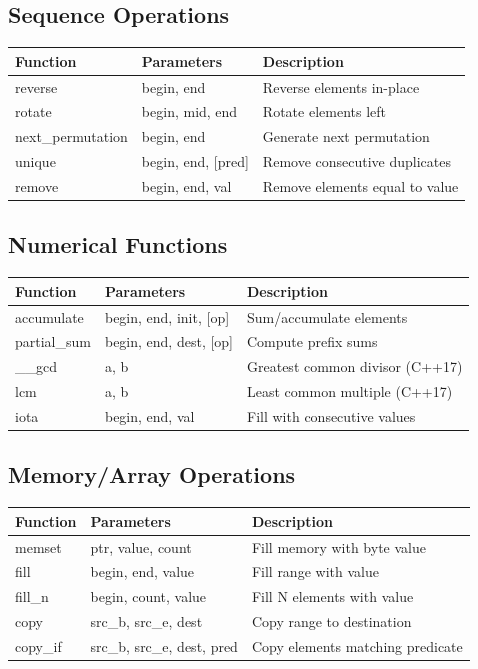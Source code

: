 \documentclass[10pt]{article}
\begin{document}
\begin{multicols*}{2}
\subsection*{Sequence Operations}
\begin{tabularx}{\linewidth}{|l|l|X|}
    \hline
    \textbf{Function} & \textbf{Parameters} & \textbf{Description} \\
    \hline
    reverse & begin, end & Reverse elements in-place \\
    \hline
    rotate & begin, mid, end & Rotate elements left \\
    \hline
    next\_permutation & begin, end & Generate next permutation \\
    \hline
    unique & begin, end, [pred] & Remove consecutive duplicates \\
    \hline
    remove & begin, end, val & Remove elements equal to value \\
    \hline
\end{tabularx}

\subsection*{Numerical Functions}
\begin{tabularx}{\linewidth}{|l|l|X|}
    \hline
    \textbf{Function} & \textbf{Parameters} & \textbf{Description} \\
    \hline
    accumulate & begin, end, init, [op] & Sum/accumulate elements \\
    \hline
    partial\_sum & begin, end, dest, [op] & Compute prefix sums \\
    \hline
    \_\_gcd & a, b & Greatest common divisor (C++17) \\
    \hline
    lcm & a, b & Least common multiple (C++17) \\
    \hline
    iota & begin, end, val & Fill with consecutive values \\
    \hline
\end{tabularx}

\subsection*{Memory/Array Operations}
\begin{tabularx}{\linewidth}{|l|l|X|}
    \hline
    \textbf{Function} & \textbf{Parameters} & \textbf{Description} \\
    \hline
    memset & ptr, value, count & Fill memory with byte value \\
    \hline
    fill & begin, end, value & Fill range with value \\
    \hline
    fill\_n & begin, count, value & Fill N elements with value \\
    \hline
    copy & src\_b, src\_e, dest & Copy range to destination \\
    \hline
    copy\_if & src\_b, src\_e, dest, pred & Copy elements matching predicate \\
    \hline
\end{tabularx}


\end{multicols*}
\end{document}
